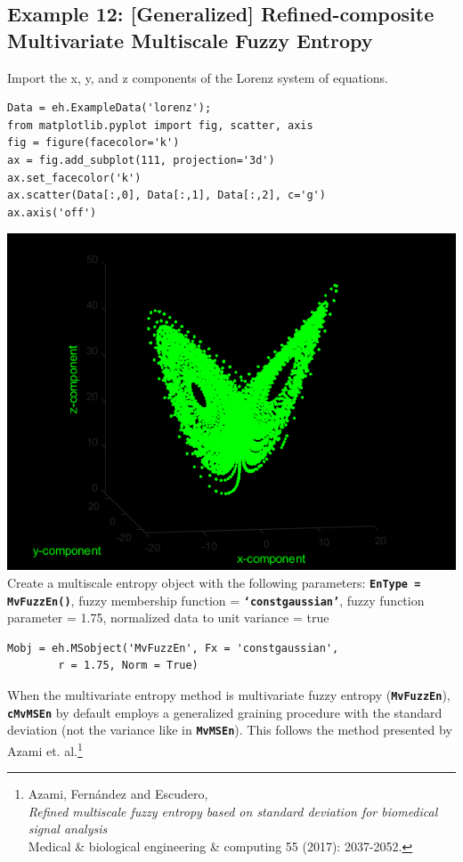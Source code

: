 \documentclass[12pt, a4paper, titlepage, openany]{book}
\begin{document}
\subsection{\normalsize Example 12: \hspace{15mm} [Generalized] Refined-composite Multivariate Multiscale Fuzzy Entropy}
\noindent Import the x, y, and z components of the Lorenz system of equations.
\begin{verbatim}
Data = eh.ExampleData('lorenz');
from matplotlib.pyplot import fig, scatter, axis
fig = figure(facecolor='k')
ax = fig.add_subplot(111, projection='3d')
ax.set_facecolor('k')
ax.scatter(Data[:,0], Data[:,1], Data[:,2], c='g')
ax.axis('off')
\end{verbatim}
\includegraphics[scale=.4]{lorenz.png}\newline \newline
Create a multiscale entropy object with the following parameters: \texttt{\textbf{EnType = MvFuzzEn()}}, fuzzy membership function = \texttt{\textbf{‘constgaussian’}}, fuzzy function parameter = 1.75, normalized data to unit variance = true
\begin{verbatim}
Mobj = eh.MSobject('MvFuzzEn', Fx = 'constgaussian', 
		r = 1.75, Norm = True)
\end{verbatim}
\begin{tcolorbox}[colback=ehone!5, colframe=ehtwo!, title=\hypertarget{bidinote}{\textbf{ATTENTION}}, label={BiBox}]
When the multivariate entropy method is multivariate fuzzy entropy (\texttt{\textbf{MvFuzzEn}}), \texttt{\textbf{cMvMSEn}} by default employs a generalized graining procedure with the standard deviation (not the variance like in \texttt{\textbf{MvMSEn}}). This follows the method presented by Azami et. al.\footnote{Azami, Fernández and Escudero,\\ \indent\indent \emph{Refined multiscale fuzzy entropy based on standard deviation for biomedical signal analysis} \\ 
\indent\indent Medical \& biological engineering \& computing 55 (2017): 2037-2052.}
\end{tcolorbox}
\end{document}
